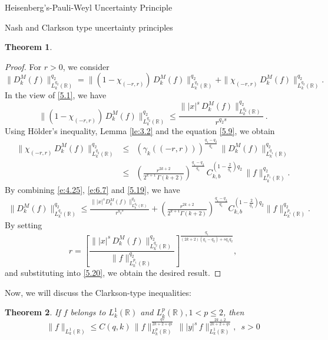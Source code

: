 \documentclass[12pt,a4paper,reqno]{amsproc}
\newtheorem{theorem}{Theorem}[section]
\theoremstyle{definition}
\theoremstyle{remark}
\numberwithin{equation}{section}
\begin{document}
\begin{subsection}{Heisenberg's-Pauli-Weyl Uncertainty Principle}
\begin{subsection}{Nash and Clarkson type uncertainty principles}
\begin{theorem}
\end{theorem}
\begin{proof}
   For $r>0$, we consider
\begin{equation}\label{e:4.25}
\|D_k^M(f)\|^{q_2}_{L_k^{q_2}(\mathbb{R})}=  \|(1-\chi_{(-r,r)})\,D_k^M(f)\|^{q_2}_{L_k^{q_2}(\mathbb{R})} +   \|\chi_{(-r,r)}\, D_k^M(f)\|^{q_2}_{L_k^{q_2}(\mathbb{R})}.
\end{equation}
In the view of \eqref{5.1}, we have
    \begin{equation} \label{e:6.7}
\|(1-\chi_{(-r,r)})\,D_k^M(f)\|^{q_2}_{L_k^{q_2}(\mathbb{R})} \le \frac{\||x|^s\, D_k^M(f)\| ^{q_2}_{L_k^{q_2}(\mathbb{R})}}{r^{q_2s}}  \, .     
    \end{equation}
Using H{\"o}lder's inequality, Lemma \ref{le:3.2} and  the equation \eqref{5.9}, we obtain
\begin{eqnarray} \label{5.19}
\nonumber  \|\chi_{(-r,r)}\, D_k^M(f)\|^{q_2}_{L_k^{q_2}(\mathbb{R})} &\le& \left(\gamma_k((-r,r))\right)^{\frac{q_1-q_2}{q_1}} \, \|D_k^M(f)\|^{q_2}_{L_k^{q_1}(\mathbb{R})}\\
&\le& \left(\frac{r^{2k+2}}{2^{k+1}\,\Gamma(k+2) }\right)^{\frac{q_1-q_2}{q_1}}\, C_{k,b}^{(1-\frac{2}{q_1})q_2}\,\|f\|^{q_2}_{L_k^{p_1}(\mathbb{R})}.   
\end{eqnarray}
By combining \eqref{e:4.25}, \eqref{e:6.7} and \eqref{5.19}, we have
\begin{multline}\label{5.20}
\|D_k^M(f)\|^{q_2}_{L_k^{q_2}(\mathbb{R})} \le \frac{\||x|^s D_k^M(f)\| ^{q_2}_{L_k^{q_2}(\mathbb{R})}}{r^{q_2s}}  + \left(\frac{r^{2k+2}}{2^{k+1}\Gamma(k+2) }\right)^{\frac{q_1-q_2}{q_1}} C_{k,b}^{(1-\frac{2}{q_1})q_2}\|f\|^{q_2}_{L_k^{p_1}(\mathbb{R})}.
\end{multline}
By setting 
\begin{equation*}
    r= \left[\frac{\||x|^s\, D_k^M(f)\| ^{q_2}_{L_k^{q_2}(\mathbb{R})}}{\|f\|^{q_2}_{L_k^{p_1}(\mathbb{R})}}\right]^{\frac{q_1}{(2k+2)(q_1-q_2)+sq_1q_2}},
\end{equation*}
and substituting into  \eqref{5.20}, we obtain the desired result.
\end{proof}
Now, we will discuss the Clarkson-type  inequalities:
\begin{theorem}
If $f$ belongs to $L^1_k(\mathbb{R})$ and $ L^p_k(\mathbb{R}), 1<p\le 2$, then 
\begin{equation*}
\|f\|_{L^1_k(\mathbb{R})}  \le C(q,k)\,\|f\|_{L_k^p(\mathbb{R})}^{\frac{qs}{2k+2+qs}}\, \||y|^s\,f\|_{L^1_k(\mathbb{R})}^{\frac{2k+2}{2k+2+qs}}, \,\,\, s>0 
\end{equation*}

\end{theorem}
\end{subsection}
\end{subsection}
\end{document}
